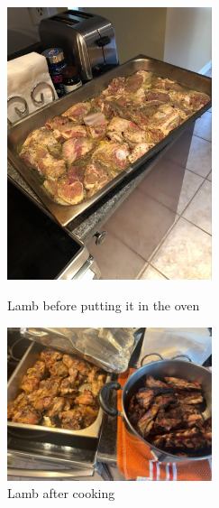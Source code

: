 \begin{figure}
  \includegraphics[width=60mm]{monanteras/images/Lamb.jpg}
  \caption{Lamb before putting it in the oven}
  \label{fig:fig}
  \includegraphics[width=60mm]{monanteras/images/Lamb 2.jpg}
  \caption{Lamb after cooking}
  \label{fig:fig}
\end{figure}